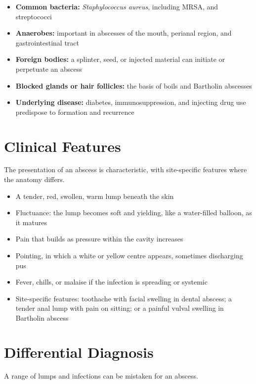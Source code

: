 \begin{itemize}
    \item \textbf{Common bacteria:} \textit{Staphylococcus aureus}, including MRSA, and streptococci
    \item \textbf{Anaerobes:} important in abscesses of the mouth, perianal region, and gastrointestinal tract
    \item \textbf{Foreign bodies:} a splinter, seed, or injected material can initiate or perpetuate an abscess
    \item \textbf{Blocked glands or hair follicles:} the basis of boils and Bartholin abscesses
    \item \textbf{Underlying disease:} diabetes, immunosuppression, and injecting drug use predispose to formation and recurrence
\end{itemize}

\section*{Clinical Features}
The presentation of an abscess is characteristic, with site-specific features where the anatomy differs.

\begin{itemize}
    \item A tender, red, swollen, warm lump beneath the skin
    \item Fluctuance: the lump becomes soft and yielding, like a water-filled balloon, as it matures
    \item Pain that builds as pressure within the cavity increases
    \item Pointing, in which a white or yellow centre appears, sometimes discharging pus
    \item Fever, chills, or malaise if the infection is spreading or systemic
    \item Site-specific features: toothache with facial swelling in dental abscess; a tender anal lump with pain on sitting; or a painful vulval swelling in Bartholin abscess
\end{itemize}

\section*{Differential Diagnosis}
A range of lumps and infections can be mistaken for an abscess.


